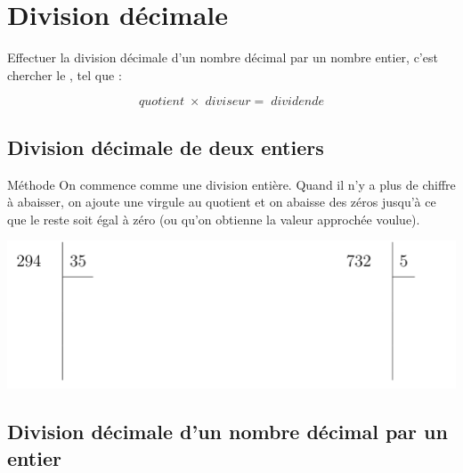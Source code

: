\documentclass[xcolor={dvipsnames}]{beamer}
\begin{document}
\section{Division décimale}

\begin{frame}
	\begin{mydef}
		Effectuer la division décimale d'un nombre décimal par un nombre entier, c'est chercher le , tel que : \pause
		
		\begin{equation*}
			quotient \; \times \; diviseur = \; dividende
		\end{equation*}
	\end{mydef}
\end{frame}

\subsection{Division décimale de deux entiers}


\begin{frame}
	\begin{block}{Méthode}
		On commence comme une division entière. \pause Quand il n'y a plus de chiffre à abaisser, on ajoute une virgule au quotient et on abaisse des zéros jusqu'à ce que le reste soit égal à zéro \pause  (ou qu'on obtienne la valeur approchée voulue).\pause
	\end{block}

	\begin{myexs}
		\begin{center}
			\includegraphics[scale=0.45]{dvi2}
		\end{center}
	\end{myexs}
\end{frame}


\subsection{Division décimale d'un nombre décimal par un entier}
\end{document}
